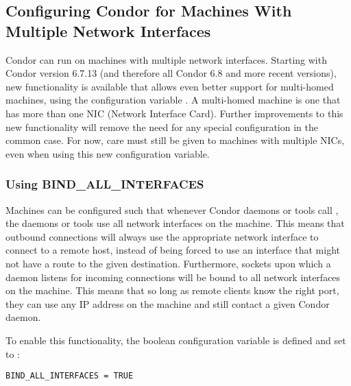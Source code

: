 \subsection{\label{sec:Multiple-Interfaces}Configuring Condor for
Machines With Multiple Network Interfaces } 


Condor can run on machines with
multiple network interfaces.
Starting with Condor version 6.7.13
(and therefore all Condor 6.8 and more recent versions),
new functionality is
available that allows even better support for multi-homed
machines, using the configuration variable .
A multi-homed machine is one that has more than one
NIC (Network Interface Card).
Further improvements to this new functionality will remove the need
for any special configuration in the common case.
For now, care
must still be given to machines with multiple NICs, even
when using this new configuration variable.


\subsubsection{\label{sec:Using-BindAllInterfaces}Using 
BIND\_ALL\_INTERFACES}

Machines can be configured such that
whenever Condor daemons or tools
call , the daemons or tools use all network interfaces on
the machine.
This means that outbound connections will always use the appropriate
network interface to connect to a remote host,
instead of being forced to use
an interface that might not have a route to the given destination.
Furthermore, sockets upon which a daemon listens for incoming connections 
will be bound to all network interfaces on the machine.
This means that so long as remote clients know the right port, they can
use any IP address on the machine and still contact a given Condor daemon.

To enable this functionality, the boolean configuration
variable
is defined and set to :

\begin{verbatim}
BIND_ALL_INTERFACES = TRUE
\end{verbatim}

